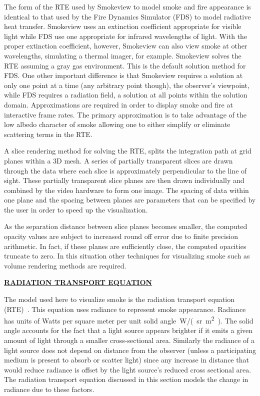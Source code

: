 \documentclass[11pt]{article}
\newcommand{\ssection}[1]{\underline{\bf #1}}
\begin{document}
The form of the RTE used by Smokeview to model smoke and fire
appearance is identical to that used by the Fire Dynamics Simulator (FDS) to model radiative
heat transfer. Smokeview uses an extinction coefficient
appropriate for visible light while FDS use one appropriate for
infrared wavelengths of light.  With the proper extinction
coefficient, however, Smokeview can also view smoke at other
wavelengths, simulating a thermal imager, for example. Smokeview
solves the RTE assuming a gray gas environment. This is the
default solution method for FDS. One other important difference is
that Smokeview requires a solution at only one point at a time
(any arbitrary point though), the observer's viewpoint, while FDS
requires a radiation field, a solution at all points within the
solution domain.
Approximations are
required in order to display smoke and fire at interactive frame
rates.  The primary approximation is to take advantage of the low
albedo character of smoke allowing one to either simplify or
eliminate scattering terms in the RTE.

A slice rendering method for solving the RTE,  splits the
integration path at grid planes within a 3D mesh.
A series of partially transparent slices are drawn through the data where each
slice is approximately perpendicular to the line of sight.
These partially transparent slice planes are then drawn
individually and combined by the video hardware to form one image.
The spacing of data within one plane and the spacing between planes are parameters
that can be specified by the user in order to speed up the visualization.

As the separation distance between slice planes becomes smaller, the
computed opacity values are subject to increased round off error
due to finite precision arithmetic.  In fact, if these planes are
sufficiently close, the computed opacities truncate to zero.   In
this situation other techniques for visualizing smoke such as volume rendering methods are required.


\ssection{RADIATION TRANSPORT EQUATION}

The model used here to visualize smoke is the radiation transport
equation (RTE)~\cite{Siegel:2001}.  This equation uses radiance to
represent smoke appearance.  Radiance has units of Watts per
square meter per unit solid angle~\si{W/(sr.m^2)}.  The solid
angle accounts for the fact that a light source appears brighter
if it emits a given amount of light through a smaller
cross-sectional area.  Similarly the radiance of a light source does not
depend on distance from the
observer (unless a participating medium is present to absorb or
scatter  light) since any increase in distance that would reduce radiance is offset
by the light source's reduced cross sectional area.
The radiation transport equation discussed in
this section models the change in radiance due to these factors.
\end{document}
